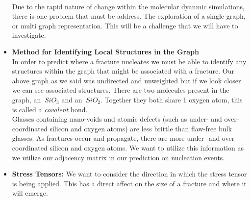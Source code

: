 \begin{itemize}
\bigskip
\\
Due to the rapid nature of change within the molecular dyanmic simulations, there is one problem that must be address. The exploration of a single graph, or multi graph representation. This will be a challenge that we will have to investigate.   

\item \textbf{Method for Identifying Local Structures in the Graph}
\bigskip
\\
In order to predict where a fracture nucleates we must be able to identify any structures within the graph that might be associated with a fracture. Our above graph as we said was undirected and unweighted but if we look closer we can see associated structures. There are two molecules present in the graph, an $\ SiO_{3}$ and an $\ SiO_{2}$. Together they both share 1 oxygen atom, this is called a \textit{covalent} bond.
\bigskip
\\
Glasses containing nano-voids and atomic defects (such as under- and over-coordinated silicon and oxygen atoms) are less brittle than flaw-free bulk glasses. As fractures occur and propagate, there are more under- and over-coordinated silicon and oxygen atoms. We want to utilize this information as we utilize our adjacency matrix in our prediction on nucleation events. 
    \item \textbf{Stress Tensors:} We want to consider the direction in which the stress tensor is being applied. This has a direct affect on the size of a fracture and where it will emerge.
\end{itemize}

